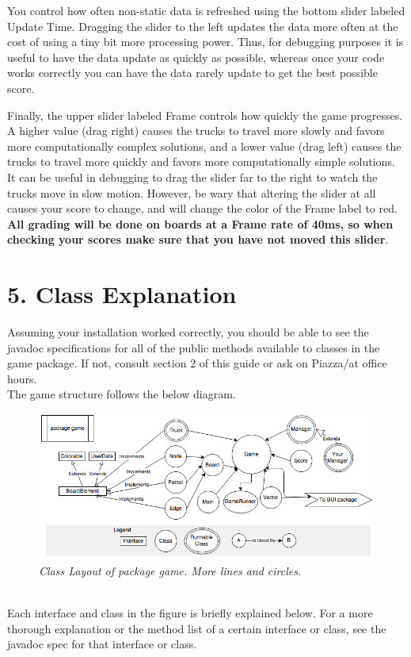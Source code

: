 \documentclass[11pt]{article}
\begin{document}
You control how often non-static data is refreshed using the bottom slider
labeled Update Time. Dragging the slider to the left updates the data more often
at the cost of using a tiny bit more processing power. Thus, for debugging
purposes it is useful to have the data update as quickly as possible, whereas
once your code works correctly you can have the data rarely update to get the
best possible score.

Finally, the upper slider labeled Frame controls how quickly the game
progresses. A higher value (drag right) causes the trucks to travel more slowly
and favors more computationally complex solutions, and a lower value (drag left)
causes the trucks to travel more quickly and favors more computationally simple
solutions. It can be useful in debugging to drag the slider far to the right to
watch the trucks move in slow motion. However, be wary that altering the slider
at all causes your score to change, and will change the color of the Frame label
to red. \textbf{All grading will be done on boards at a Frame rate of 40ms, so
when checking your scores make sure that you have not moved this slider}.

\newpage
\section{5. Class Explanation}
Assuming your installation worked correctly, you should be able to see the
javadoc specifications for all of the public methods available to classes in the
game package. If not, consult section 2 of this guide or ask on Piazza/at office
hours.\\
The game structure follows the below diagram.
\begin{figure}[h]
\centerline{\includegraphics[scale=0.7]{hirearchy.png}} 
\caption{\em{Class Layout of package game. More lines and circles.}}
\end{figure}
\\Each interface and class in the figure is briefly explained below. For a more
thorough  explanation or the method list of a certain interface or class, see
the javadoc spec for that interface or class.
\end{document}
